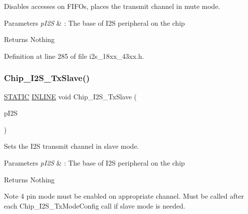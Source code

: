 Disables accesses on F\+I\+F\+Os, places the transmit channel in mute mode. 


\begin{DoxyParams}{Parameters}
{\em p\+I2S} & \+: The base of I2S peripheral on the chip \\
\hline
\end{DoxyParams}
\begin{DoxyReturn}{Returns}
Nothing 
\end{DoxyReturn}


Definition at line 285 of file i2s\+\_\+18xx\+\_\+43xx.\+h.

\mbox{\label{group___i2_s__18_x_x__43_x_x_gae9f1791ca07fb3672d2f2c379f437f3c}} 
\subsubsection{\texorpdfstring{Chip\+\_\+\+I2\+S\+\_\+\+Tx\+Slave()}{Chip\_I2S\_TxSlave()}}
{\footnotesize\ttfamily \hyperlink{group___l_p_c___types___public___macros_ga10b2d890d871e1489bb02b7e70d9bdfb}{S\+T\+A\+T\+IC} \hyperlink{spifi__18xx__43xx_8h_a2eb6f9e0395b47b8d5e3eeae4fe0c116}{I\+N\+L\+I\+NE} void Chip\+\_\+\+I2\+S\+\_\+\+Tx\+Slave (\begin{DoxyParamCaption}\item[{\hyperlink{struct_l_p_c___i2_s___t}{L\+P\+C\+\_\+\+I2\+S\+\_\+T} $\ast$}]{p\+I2S }\end{DoxyParamCaption})}



Sets the I2S transmit channel in slave mode. 


\begin{DoxyParams}{Parameters}
{\em p\+I2S} & \+: The base of I2S peripheral on the chip \\
\hline
\end{DoxyParams}
\begin{DoxyReturn}{Returns}
Nothing 
\end{DoxyReturn}
\begin{DoxyNote}{Note}
4 pin mode must be enabled on appropriate channel. Must be called after each Chip\+\_\+\+I2\+S\+\_\+\+Tx\+Mode\+Config call if slave mode is needed. 
\end{DoxyNote}


